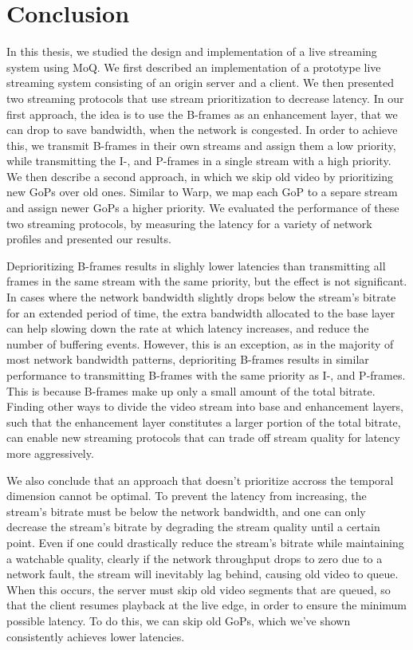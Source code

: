 
\chapter{Conclusion}\label{chapter:conclusion}
In this thesis, we studied the design and implementation of a live streaming system using \ac{MoQ}. We first described an implementation of a prototype live streaming system consisting of an origin server and a client. We then presented two streaming protocols that use stream prioritization to decrease latency. In our first approach, the idea is to use the B-frames as an enhancement layer, that we can drop to save bandwidth, when the network is congested. In order to achieve this, we transmit B-frames in their own streams and assign them a low priority, while transmitting the I-, and P-frames in a single stream with a high priority. We then describe a second approach, in which we skip old video by prioritizing new \acp{GoP} over old ones. Similar to Warp, we map each GoP to a separe stream and assign newer GoPs a higher priority. We evaluated the performance of these two streaming protocols, by measuring the latency for a variety of network profiles and presented our results.

Deprioritizing B-frames results in slighly lower latencies than transmitting all frames in the same stream with the same priority, but the effect is not significant. In cases where the network bandwidth slightly drops below the stream's bitrate for an extended period of time, the extra bandwidth allocated to the base layer can help slowing down the rate at which latency increases, and reduce the number of buffering events. However, this is an exception, as in the majority of most network bandwidth patterns, deprioriting B-frames results in similar performance to transmitting B-frames with the same priority as I-, and P-frames. This is because B-frames make up only a small amount of the total bitrate. Finding other ways to divide the video stream into base and enhancement layers, such that the enhancement layer constitutes a larger portion of the total bitrate, can enable new streaming protocols that can trade off stream quality for latency more aggressively.

We also conclude that an approach that doesn't prioritize accross the temporal dimension cannot be optimal. To prevent the latency from increasing, the stream's bitrate must be below the network bandwidth, and one can only decrease the stream's bitrate by degrading the stream quality until a certain point. Even if one could drastically reduce the stream's bitrate while maintaining a watchable quality, clearly if the network throughput drops to zero due to a network fault, the stream will inevitably lag behind, causing old video to queue. When this occurs, the server must skip old video segments that are queued, so that the client resumes playback at the live edge, in order to ensure the minimum possible latency. To do this, we can skip old GoPs, which we've shown consistently achieves lower latencies.

